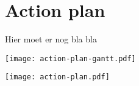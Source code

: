 
\chapter{Action plan}
\label{chp:action_plan}

Hier moet er nog bla bla %

\texttt{[image: action-plan-gantt.pdf]}

\newpage

\texttt{[image: action-plan.pdf]}
